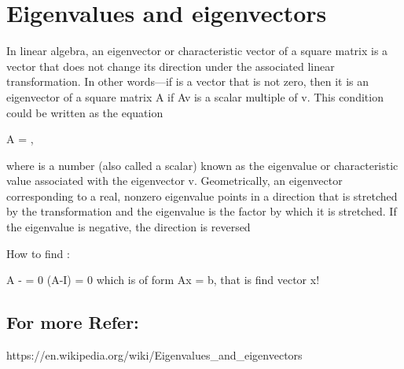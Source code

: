 \chapter{Eigenvalues and eigenvectors}

In linear algebra, an eigenvector or characteristic vector of a square matrix is a vector that does not change its
direction under the associated linear transformation. In other words—if  is a vector that is not zero, then it
is an eigenvector of a square matrix A if Av is a scalar multiple of v. This condition could be written as the equation

A = \lambda {},

 where \lambda is a number (also called a scalar) known as the eigenvalue or characteristic value associated with the
 eigenvector v. Geometrically, an eigenvector corresponding to a real, nonzero eigenvalue points in a direction that
 is stretched by the transformation and the eigenvalue is the factor by which it is stretched. If the eigenvalue is
 negative, the direction is reversed


How to find :

A - \lambda {} = 0
(A-\lambda I) = 0
which is of form
Ax = b, that is find vector x!

 \section{For more Refer:}
 https://en.wikipedia.org/wiki/Eigenvalues_and_eigenvectors